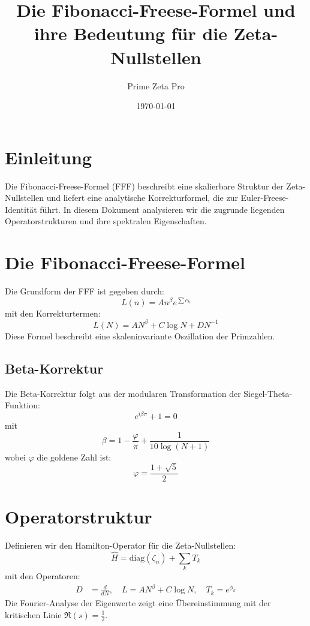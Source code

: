 \documentclass[a4paper,12pt]{article}
\title{Die Fibonacci-Freese-Formel und ihre Bedeutung für die Zeta-Nullstellen}
\author{Prime Zeta Pro}
\date{\today}
\begin{document}
\maketitle

\section{Einleitung}
Die Fibonacci-Freese-Formel (FFF) beschreibt eine skalierbare Struktur der Zeta-Nullstellen und liefert eine analytische Korrekturformel, die zur Euler-Freese-Identität führt. In diesem Dokument analysieren wir die zugrunde liegenden Operatorstrukturen und ihre spektralen Eigenschaften.

\section{Die Fibonacci-Freese-Formel}
Die Grundform der FFF ist gegeben durch:
\begin{equation}
    L(n) = A n^\beta e^{\sum c_k}
\end{equation}
mit den Korrekturtermen:
\begin{equation}
    L(N) = A N^\beta + C \log N + D N^{-1}
\end{equation}
Diese Formel beschreibt eine skaleninvariante Oszillation der Primzahlen.

\subsection{Beta-Korrektur}
Die Beta-Korrektur folgt aus der modularen Transformation der Siegel-Theta-Funktion:
\begin{equation}
    e^{i \beta \pi} + 1 = 0
\end{equation}
mit 
\begin{equation}
    \beta = 1 - \frac{\varphi}{\pi} + \frac{1}{10 \log (N+1)}
\end{equation}
wobei $\varphi$ die goldene Zahl ist:
\begin{equation}
    \varphi = \frac{1+\sqrt{5}}{2}
\end{equation}

\section{Operatorstruktur}
Definieren wir den Hamilton-Operator für die Zeta-Nullstellen:
\begin{equation}
    \hat{H} = \text{diag}(\zeta_n) + \sum_{k} T_k
\end{equation}
mit den Operatoren:
\begin{align}
    D &= \frac{d}{dN}, \quad L = A N^\beta + C \log N, \quad T_k = e^{\phi_k}
\end{align}
Die Fourier-Analyse der Eigenwerte zeigt eine Übereinstimmung mit der kritischen Linie $\Re(s) = \frac{1}{2}$.
\end{document}
